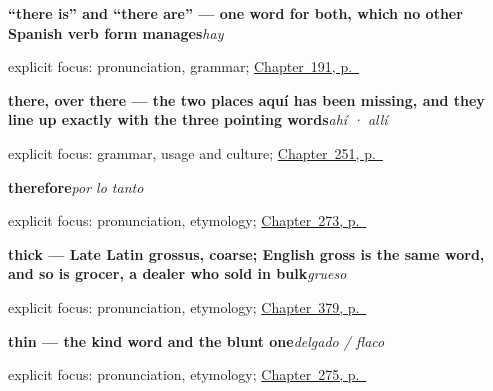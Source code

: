 \noindent\begin{minipage}[t]{\linewidth}
\raggedright
\textbf{\textquotedblleft{}there is\textquotedblright{} and \textquotedblleft{}there are\textquotedblright{} — one word for both, which no other Spanish verb form manages}\enspace\emph{hay}\par
\footnotesize explicit focus: pronunciation, grammar; \hyperref[ch:hay]{Chapter~191, p.~\pageref*{ch:hay}}
\end{minipage}\par\smallskip

\noindent\begin{minipage}[t]{\linewidth}
\raggedright
\textbf{there, over there — the two places aquí has been missing, and they line up exactly with the three pointing words}\enspace\emph{ahí · allí}\par
\footnotesize explicit focus: grammar, usage and culture; \hyperref[ch:ahi-alli]{Chapter~251, p.~\pageref*{ch:ahi-alli}}
\end{minipage}\par\smallskip

\noindent\begin{minipage}[t]{\linewidth}
\raggedright
\textbf{therefore}\enspace\emph{por lo tanto}\par
\footnotesize explicit focus: pronunciation, etymology; \hyperref[ch:parrafo]{Chapter~273, p.~\pageref*{ch:parrafo}}
\end{minipage}\par\smallskip

\noindent\begin{minipage}[t]{\linewidth}
\raggedright
\textbf{thick — Late Latin grossus, coarse; English gross is the same word, and so is grocer, a dealer who sold in bulk}\enspace\emph{grueso}\par
\footnotesize explicit focus: pronunciation, etymology; \hyperref[ch:seco-y-mojado]{Chapter~379, p.~\pageref*{ch:seco-y-mojado}}
\end{minipage}\par\smallskip

\noindent\begin{minipage}[t]{\linewidth}
\raggedright
\textbf{thin — the kind word and the blunt one}\enspace\emph{delgado / flaco}\par
\footnotesize explicit focus: pronunciation, etymology; \hyperref[ch:matices]{Chapter~275, p.~\pageref*{ch:matices}}
\end{minipage}\par\smallskip

